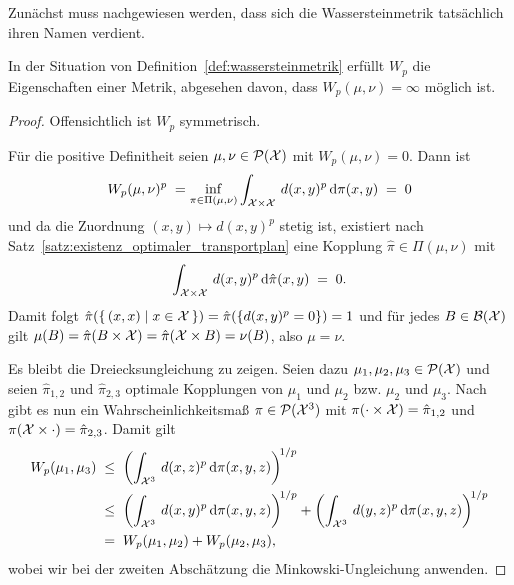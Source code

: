 \documentclass[../thesis/thesis.tex]{subfiles}
\begin{document}
	Zunächst muss nachgewiesen werden, dass sich die Wassersteinmetrik tatsächlich ihren Namen verdient.

	\begin{Satz}
		\label{satz:wassersteinmetrik_ist_metrik}
		In der Situation von Definition~\ref{def:wassersteinmetrik} erfüllt $W_p$ die Eigenschaften einer Metrik, abgesehen davon, dass $W_p(\mu, \nu) = \infty$ möglich ist.
	\end{Satz}

	\begin{proof}
		Offensichtlich ist $W_p$ symmetrisch.
		
		Für die positive Definitheit seien $\mu, \nu \in \mathcal{P}(\mathcal{X})$ mit $W_p(\mu, \nu) = 0$. Dann ist
		\[ W_p(\mu, \nu)^p \; = \inf_{\pi \in \Pi(\mu, \nu)} \int_{\mathcal{X} \times \mathcal{X}} \, d(x, y)^p \, \mathrm{d}\pi(x, y) \; = \; 0 \]
		und da die Zuordnung $(x, y) \mapsto d(x, y)^p$ stetig ist, existiert nach Satz~\ref{satz:existenz_optimaler_transportplan} eine Kopplung $\hat{\pi} \in \Pi(\mu, \nu)$ mit
		\[ \int_{\mathcal{X} \times \mathcal{X}} \, d(x, y)^p \, \mathrm{d}\hat{\pi}(x, y) \; = \; 0 \text{.} \]
		Damit folgt $\hat{\pi}(\left\{\, (x, x) \; \middle| \; x \in \mathcal{X} \,\right\}) = \hat{\pi}(\left\{d(x, y)^p = 0\right\}) = 1$ und für jedes $B \in \mathcal{B}(\mathcal{X})$ gilt
		$\mu(B) = \hat{\pi}(B \times \mathcal{X}) = \hat{\pi}(\mathcal{X} \times B) = \nu(B)$, also $\mu = \nu$.
		
		Es bleibt die Dreiecksungleichung zu zeigen. Seien dazu $\mu_1, \mu_2, \mu_3 \in \mathcal{P}(\mathcal{X})$ und seien $\hat{\pi}_{1, 2}$ und $\hat{\pi}_{2, 3}$ optimale Kopplungen von
		$\mu_1$ und $\mu_2$ bzw. $\mu_2$ und $\mu_3$. Nach \cite[S. 11--12]{Villani.2009} gibt es nun ein Wahrscheinlichkeitsmaß $\pi \in \mathcal{P}(\mathcal{X}^3)$ mit 
		$\pi(\cdot \times \mathcal{X}) = \hat{\pi}_{1, 2}$ und $\pi(\mathcal{X} \times \cdot) = \hat{\pi}_{2, 3}$. Damit gilt
		\begin{align*}
			W_p(\mu_1, \mu_3) \; &\leq \; \left(\int_{\mathcal{X}^3} \, d(x, z)^p \, \mathrm{d}\pi(x, y, z)\right)^{\! 1/p} \\
			                     &\leq \; \left(\int_{\mathcal{X}^3} \, d(x, y)^p \, \mathrm{d}\pi(x, y, z)\right)^{\! 1/p} + \left(\int_{\mathcal{X}^3} \, d(y, z)^p \, \mathrm{d}\pi(x, y, z)\right)^{\! 1/p} \\
			                     &=    \; W_p(\mu_1, \mu_2) + W_p(\mu_2, \mu_3) \text{,}
		\end{align*}
		wobei wir bei der zweiten Abschätzung die Minkowski-Ungleichung anwenden.
	\end{proof}
\end{document}
